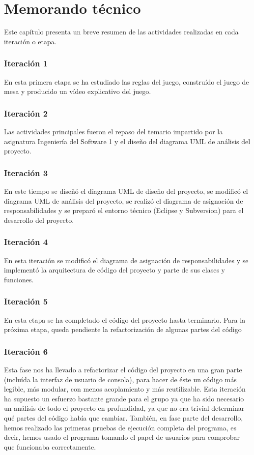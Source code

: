 \documentclass[11 pt]{book}
\begin{document}
\chapter{Memorando técnico}
	Este capítulo presenta un breve resumen de las actividades realizadas en cada iteración o etapa.
	
	\subsection*{Iteración 1}
		En esta primera etapa se ha estudiado las reglas del juego, construído el juego de mesa y producido un vídeo explicativo del juego.
		
	\subsection*{Iteración 2}
		Las actividades principales fueron el repaso del temario impartido por la asignatura Ingeniería del Software 1 y el diseño del diagrama UML de análisis del proyecto.
		
	\subsection*{Iteración 3}
		En este tiempo se diseñó el diagrama UML de diseño del proyecto, se modificó el diagrama UML de análisis del proyecto, se realizó el diagrama de asignación de responsabilidades y se preparó el entorno técnico (Eclipse y Subversion) para el desarrollo del proyecto.
		
	\subsection*{Iteración 4}
		En esta iteración se modificó el diagrama de asignación de responsabilidades y se implementó la arquitectura de código del proyecto y parte de sus clases y funciones.
	
	\subsection*{Iteración 5}
		En esta etapa se ha completado el código del proyecto hasta terminarlo. Para la próxima etapa, queda pendiente la refactorización de algunas partes del código
		
	\subsection*{Iteración 6}
		Esta fase nos ha llevado a refactorizar el código del proyecto en una gran parte (incluída la interfaz de usuario de consola), para hacer de éste un código más legible, más modular, con menos acoplamiento y más reutilizable. Esta iteración ha supuesto un esfuerzo bastante grande para el grupo ya que ha sido necesario un análisis de todo el proyecto en profundidad, ya que no era trivial determinar qué partes del código había que cambiar. También, en fase parte del desarrollo, hemos realizado las primeras pruebas de ejecución completa del programa, es decir, hemos usado el programa tomando el papel de usuarios para comprobar que funcionaba correctamente.
		
\end{document}
